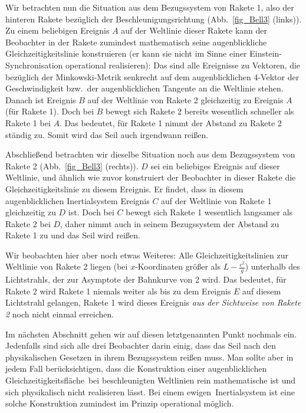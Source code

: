 Wir betrachten nun die Situation aus
dem Bezugssystem von Rakete 1, also der
hinteren Rakete bez\"uglich der
Beschleunigungsrichtung (Abb.\ \ref{fig_Bell3}
(links)). Zu einem beliebigen Ereignis $A$ auf
der Weltlinie dieser Rakete kann der Beobachter
in der Rakete zumindest mathematisch seine augenblickliche 
Gleichzeitigkeitslinie konstruieren (er kann sie nicht im Sinne
einer Einstein-Synchronisation operational realisieren): Das sind alle
Ereignisse zu Vektoren, die bez\"uglich der
Minkowski-Metrik senkrecht auf dem augenblicklichen
4-Vektor der Geschwindigkeit bzw.\ der
augenblicklichen Tangente an die Weltlinie stehen. 
Danach ist Ereignis $B$ auf der Weltlinie von
Rakete 2 gleichzeitig zu Ereignis $A$ (f\"ur 
Rakete 1). Doch bei $B$ bewegt sich Rakete
2 bereits wesentlich schneller als Rakete 1 bei $A$.
Das bedeutet, f\"ur Rakete 1 nimmt der Abstand
zu Rakete 2 st\"andig zu. Somit wird das Seil auch
irgendwann rei\ss en.

Abschlie\ss end betrachten wir dieselbe Situation
noch aus dem Bezugssystem von Rakete 2
(Abb.\ \ref{fig_Bell3} (rechts)).
$D$ sei ein beliebiges Ereignis auf dieser
Weltlinie, und \"ahnlich wie zuvor konstruiert der
Beobachter in dieser Rakete die Gleichzeitigkeitslinie
zu diesem Ereignis. Er findet, dass in diesem
augenblicklichen Inertialsystem Ereignis $C$
auf der Weltlinie von Rakete 1 gleichzeitig zu $D$
ist. Doch bei $C$ bewegt sich Rakete 1 wesentlich
langsamer als Rakete 2 bei $D$, daher nimmt 
auch in seinem Bezugssystem der Abstand zu
Rakete 1 zu und das Seil wird rei\ss en.

Wir beobachten hier aber noch etwas Weiteres:
Alle Gleichzeitigkeitslinien zur Weltlinie von Rakete
2 liegen (bei $x$-Koordinaten gr\"o\ss er als
$L-\frac{c^2}{g}$) unterhalb des Lichtstrahls,
der zur Asymptote der Bahnkurve von 2 wird. 
Das bedeutet, f\"ur Rakete 2 wird Rakete 1
niemals weiter als bis zu dem Ereignis $E$
auf diesem Lichtstrahl
gelangen, Rakete 1 wird dieses Ereignis {\em aus
der Sichtweise von Rakete 2} noch nicht einmal 
erreichen. 

Im n\"achsten Abschnitt gehen wir auf diesen
letztgenannten Punkt nochmals ein. Jedenfalls
sind sich alle drei Beobachter darin einig,
dass das Seil nach den physikalischen Gesetzen
in ihrem Bezugssystem rei\ss en muss.
Man sollte aber in jedem Fall ber\"ucksichtigen,
dass die Konstruktion einer \glqq augenblicklichen
Gleichzeitigkeitsfl\"ache\grqq\ bei beschleunigten
Weltlinien rein mathematische ist und sich 
physikalisch nicht realisieren l\"asst. Bei einem
\glqq ewigen\grqq\ Inertialsystem ist eine
solche Konstruktion zumindest im Prinzip
operational m\"oglich. 

